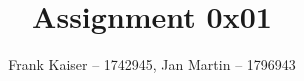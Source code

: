 \documentclass{article}
\begin{document}
\title{Assignment 0x01}
\author{Frank Kaiser -- 1742945, Jan Martin -- 1796943}

\maketitle

\tableofcontents





\end{document}
